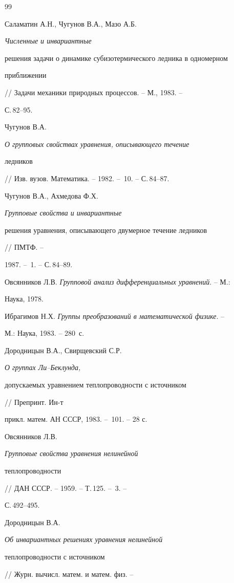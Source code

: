 \begin{thebibliography}{99}







Саламатин А.Н., Чугунов В.А., Мазо А.Б. {\em Численные и инвариантные


решения задачи о динамике субизотермического ледника в одномерном


приближении} // Задачи механики природных процессов. -- М., 1983. --


С.\,82--95.




Чугунов В.А. {\em О групповых свойствах уравнения, описывающего течение


ледников} // Изв. вузов. Математика. -- 1982. -- \No\,10. -- С.\,84--87.




Чугунов В.А., Ахмедова Ф.Х. {\em Групповые свойства и инвариантные


решения уравнения, описывающего двумерное течение ледников} // ПМТФ. --


1987. -- \No\,1. -- С.\,84--89.




Овсянников Л.В. {\em Групповой анализ дифференциальных уравнений}. -- М.:


Наука, 1978.




Ибрагимов Н.Х. {\em Группы преобразований в математической физике}. --


М.: Наука, 1983. -- 280~с.




Дородницын В.А., Свирщевский С.Р. {\em О группах Ли--Беклунда,


допускаемых уравнением теплопроводности с источником} // Препринт. Ин-т


прикл. матем. АН СССР, 1983. -- \No\,101. -- 28 с.




Овсянников Л.В. {\em Групповые свойства уравнения нелинейной


теплопроводности} // ДАН СССР. -- 1959. -- Т.\,125. -- \No\,3. --


С.\,492--495.




Дородницын В.А. {\em Об инвариантных решениях уравнения нелинейной


теплопроводности с источником} // Журн. вычисл. матем. и матем. физ. --



\end{thebibliography}
